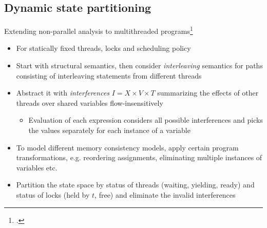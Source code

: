 \documentclass[aspectratio=169,14pt]{beamer}
\begin{document}
\subsection{Dynamic state partitioning}
\begin{frame}{}
\end{frame}

\begin{frame}{Extending non-parallel analysis to multithreaded programs\footcite{mine2011static}}
  \footnotesize
  \begin{itemize}[<+->]
  \item For statically fixed threads, locks and scheduling policy
  \item Start with structural semantics, then consider \emph{interleaving} semantics for paths consisting of interleaving statements from different threads
  \item Abstract it with \emph{interferences} $I = X \times V \times T$ summarizing the effects of other threads over shared variables flow-insensitively
    \begin{itemize}[<+->]\footnotesize
    \item Evaluation of each expression considers all possible interferences and picks the values separately for each instance of a variable
    \end{itemize}
  \item To model different memory consistency models, apply certain program transformations, e.g. reordering assignments, eliminating multiple instances of variables etc.
  \item Partition the state space by status of threads (waiting, yielding, ready) and status of locks (held by $t$, free) and eliminate the invalid interferences
  \end{itemize}
\end{frame}

\begin{frame}{}
\end{frame}
\end{document}
